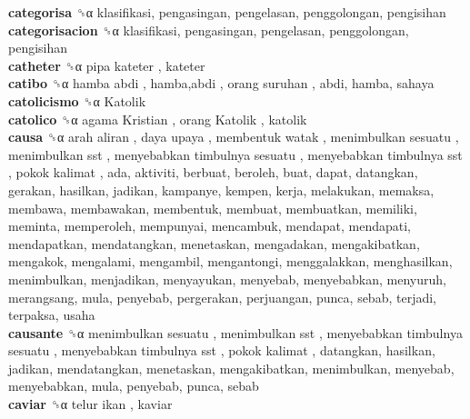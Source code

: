 \textbf{categorisa} ␝α  klasifikasi, pengasingan, pengelasan, penggolongan, pengisihan  \\
\textbf{categorisacion} ␝α  klasifikasi, pengasingan, pengelasan, penggolongan, pengisihan  \\
\textbf{catheter} ␝α   pipa kateter , kateter  \\
\textbf{catibo} ␝α   hamba abdi ,  hamba,abdi ,  orang suruhan , abdi, hamba, sahaya  \\
\textbf{catolicismo} ␝α   Katolik   \\
\textbf{catolico} ␝α   agama Kristian ,  orang Katolik , katolik  \\
\textbf{causa} ␝α   arah aliran ,  daya upaya ,  membentuk watak ,  menimbulkan sesuatu ,  menimbulkan sst ,  menyebabkan timbulnya sesuatu ,  menyebabkan timbulnya sst ,  pokok kalimat , ada, aktiviti, berbuat, beroleh, buat, dapat, datangkan, gerakan, hasilkan, jadikan, kampanye, kempen, kerja, melakukan, memaksa, membawa, membawakan, membentuk, membuat, membuatkan, memiliki, meminta, memperoleh, mempunyai, mencambuk, mendapat, mendapati, mendapatkan, mendatangkan, menetaskan, mengadakan, mengakibatkan, mengakok, mengalami, mengambil, mengantongi, menggalakkan, menghasilkan, menimbulkan, menjadikan, menyayukan, menyebab, menyebabkan, menyuruh, merangsang, mula, penyebab, pergerakan, perjuangan, punca, sebab, terjadi, terpaksa, usaha  \\
\textbf{causante} ␝α   menimbulkan sesuatu ,  menimbulkan sst ,  menyebabkan timbulnya sesuatu ,  menyebabkan timbulnya sst ,  pokok kalimat , datangkan, hasilkan, jadikan, mendatangkan, menetaskan, mengakibatkan, menimbulkan, menyebab, menyebabkan, mula, penyebab, punca, sebab  \\
\textbf{caviar} ␝α   telur ikan , kaviar  \\
